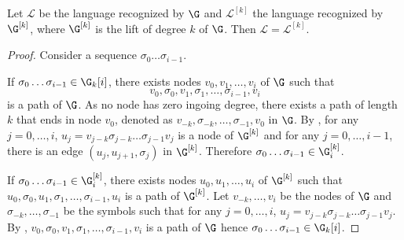\documentclass[11pt,twoside,a4paper,openright]{uclouvain-thesis}
\newcommand{\Paths}{\G_k}
\newcommand{\Lang}{\mathcal{L}}
\newcommand{\DLang}[1][k]{\Lang^{[#1]}}
\newcommand{\DPaths}[1][t]{\G_{#1}^{[k]}}
\newcommand{\Deb}[1][k]{\G^{[#1]}}
\begin{document}
\begin{myprop}
  \label{prop:incl}
  Let $\Lang$ be the language recognized by $\G$ and $\DLang$ the language recognized by $\Deb$,
  where $\Deb$ is the lift of degree $k$ of $\G$.
  Then $\Lang = \DLang$.

  \begin{proof}
    Consider a sequence $\sigma_{0} \ldots \sigma_{i-1}$.

    If $\sigma_{0} \ldots \sigma_{i-1} \in \Paths[i]$, there exists nodes $v_0, v_1, \ldots, v_i$ of $\G$ such that
    $$v_0, \sigma_0, v_1, \sigma_1, \ldots, \sigma_{i-1}, v_{i}$$
    is a path of $\G$.
    As no node has zero ingoing degree, there exists a path of length $k$ that ends in node $v_0$, denoted as $v_{-k}, \sigma_{-k}, \ldots, \sigma_{-1}, v_0$ in $\G$.
    By , for any $j = 0, \ldots, i$, $u_j=v_{j-k}\sigma_{j-k}\ldots\sigma_{j-1}v_{j}$ is a node of $\Deb$ and for any $j = 0, \ldots, i-1$, there is an edge $(u_j, u_{j+1}, \sigma_{j})$ in $\Deb$.
    Therefore $\sigma_{0} \ldots \sigma_{i-1} \in \DPaths[i]$.

    If $\sigma_0 \ldots \sigma_{i-1} \in \DPaths[i]$, there exists nodes $u_0, u_1, \ldots, u_i$ of $\Deb$ such that
    $u_0, \sigma_0, u_1, \sigma_1, \ldots, \sigma_{i-1}, u_i$ is a path of $\Deb$.
    Let $v_{-k}, \ldots, v_i$ be the nodes of $\G$ and $\sigma_{-k}, \ldots, \sigma_{-1}$ be the symbols such that for any $j = 0, \ldots, i$, $u_j=v_{j-k}\sigma_{j-k}\ldots\sigma_{j-1}v_{j}$.
    By , $v_0, \sigma_0, v_1, \sigma_1, \ldots, \sigma_{i-1}, v_{i}$ is a path of $\G$ hence
    $\sigma_{0} \ldots \sigma_{i-1} \in \Paths[i]$.

  \end{proof}
\end{myprop}
\end{document}
